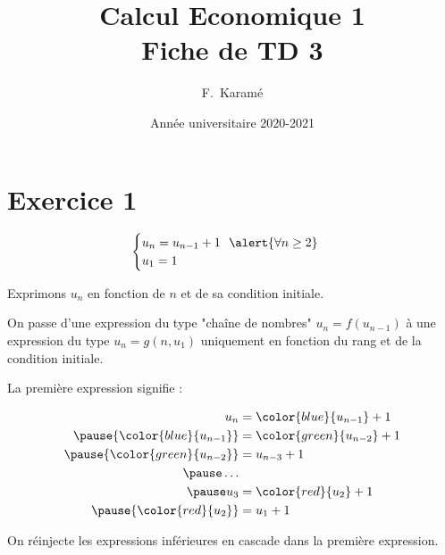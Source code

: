 \documentclass[9pt,professionalfonts,handout,hyperref]{beamer}
\title{Calcul Economique 1\\Fiche de TD 3}
\author{F.~Karamé}
\date{Année universitaire 2020-2021}
\begin{document}
\begin{frame}
	\titlepage
	
\end{frame}

\section{Exercice 1}


\begin{frame}

\[
\begin{cases}
u_n = u_{n-1} + 1~~\alert{\forall n \ge 2}\\
u_1 = 1
\end{cases}
\]

\pause Exprimons $u_n$ en fonction de $n$ et de sa condition initiale.\newline 

\pause On passe d'une expression du type "chaîne de nombres" $u_n = f(u_{n-1})$ \pause à une expression du type $u_n = g(n,u_1)$ uniquement en fonction du rang et de la condition initiale.\newline 

\pause La première expression signifie :

\[\begin{aligned}
u_n &= {\color{blue}{{u_{n-1}}}} + 1\\
\pause {\color{blue}{u_{n-1}}} &= {\color{green}{u_{n-2}}} + 1\\
\pause {\color{green}{u_{n-2}}} &= u_{n-3} + 1\\
\pause \dots\\
\pause u_{3} &= {\color{red}{u_{2}}} + 1\\
\pause {\color{red}{u_{2}}} &= u_{1} + 1
\end{aligned}\]

\pause On réinjecte les expressions inférieures en cascade dans la première expression.

\end{frame}
\end{document}
